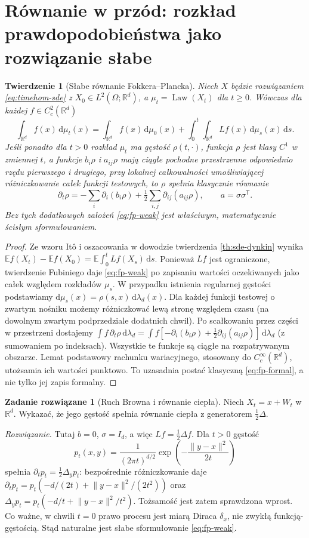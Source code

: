 \documentclass[11pt,a4paper,oneside]{report}
\numberwithin{equation}{chapter}
\theoremstyle{plain}
\newtheorem{twierdzenie}{Twierdzenie}[chapter]
\theoremstyle{definition}
\newtheorem{zadanie}{Zadanie rozwiązane}[chapter]
\theoremstyle{remark}
\newcommand{\R}{\mathbb{R}}
\newcommand{\E}{\mathbb{E}}
\newcommand{\Law}{\operatorname{Law}}
\newcommand{\dd}{\mathrm{d}}
\newcommand{\norm}[1]{\lVert #1\rVert}
\begin{document}
\section{Równanie w przód: rozkład prawdopodobieństwa jako rozwiązanie słabe}
\begin{twierdzenie}[Słabe równanie Fokkera--Plancka]
\label{th:sde-fp}
Niech $X$ będzie rozwiązaniem \eqref{eq:timehom-sde}
z $X_0\in L^2(\Omega;\R^d)$, a
$\mu_t=\Law(X_t)$ dla $t\ge0$. Wówczas dla każdej
$f\in C_c^2(\R^d)$
\[
\int_{\R^d}f(x)\,\dd\mu_t(x)
=\int_{\R^d}f(x)\,\dd\mu_0(x)
+\int_0^t\int_{\R^d}Lf(x)\,\dd\mu_s(x)\,\dd s.
\tag{6.9}\label{eq:fp-weak}
\]
Jeśli ponadto dla $t>0$ rozkład $\mu_t$ ma gęstość
$\rho(t,\cdot)$, funkcja $\rho$ jest klasy $C^1$
w zmiennej $t$, a funkcje $b_i\rho$ i $a_{ij}\rho$
mają ciągłe pochodne przestrzenne odpowiednio rzędu
pierwszego i drugiego, przy lokalnej całkowalności
umożliwiającej różniczkowanie całek funkcji testowych,
to $\rho$ spełnia klasycznie równanie
\[
\partial_t\rho
=-\sum_i\partial_i(b_i\rho)
+\tfrac12\sum_{i,j}\partial_{ij}(a_{ij}\rho),
\qquad a=\sigma\sigma^{\mathsf T}.
\tag{6.10}\label{eq:fp-formal}
\]
Bez tych dodatkowych założeń \eqref{eq:fp-weak}
jest właściwym, matematycznie ścisłym sformułowaniem.
\end{twierdzenie}
\begin{proof}
Ze wzoru Itô i oszacowania w dowodzie twierdzenia
\ref{th:sde-dynkin} wynika
$\E f(X_t)-\E f(X_0)=\E\int_0^t Lf(X_s)\,\dd s$.
Ponieważ $Lf$ jest ograniczone, twierdzenie Fubiniego
daje \eqref{eq:fp-weak} po zapisaniu wartości
oczekiwanych jako całek względem rozkładów $\mu_s$.
W przypadku istnienia regularnej gęstości podstawiamy
$\dd\mu_s(x)=\rho(s,x)\,\dd\lambda_d(x)$.
Dla każdej funkcji testowej o zwartym nośniku możemy
różniczkować lewą stronę względem czasu (na dowolnym
zwartym podprzedziale dodatnich chwil). Po scałkowaniu
przez części w przestrzeni dostajemy
$\int f\,\partial_t\rho\,\dd\lambda_d
=\int f[-\partial_i(b_i\rho)+\frac12\partial_{ij}(a_{ij}\rho)]
\,\dd\lambda_d$ (z sumowaniem po indeksach).
Wszystkie te funkcje są ciągłe na rozpatrywanym obszarze.
Lemat podstawowy rachunku wariacyjnego, stosowany do
$C_c^\infty(\R^d)$, utożsamia ich wartości punktowo.
To uzasadnia postać klasyczną \eqref{eq:fp-formal},
a nie tylko jej zapis formalny.
\end{proof}

\begin{zadanie}[Ruch Browna i równanie ciepła]
Niech $X_t=x+W_t$ w $\R^d$. Wykazać, że jego gęstość
spełnia równanie ciepła z generatorem $\tfrac12\Delta$.

\emph{Rozwiązanie.} Tutaj $b=0$, $\sigma=I_d$,
a więc $Lf=\tfrac12\Delta f$. Dla $t>0$ gęstość
\[
p_t(x,y)=\frac1{(2\pi t)^{d/2}}
\exp\!\left(-\frac{\norm{y-x}^2}{2t}\right)
\]
spełnia $\partial_t p_t=\frac12\Delta_y p_t$:
bezpośrednie różniczkowanie daje
$\partial_t p_t=p_t(-d/(2t)+\norm{y-x}^2/(2t^2))$
oraz
$\Delta_y p_t=p_t(-d/t+\norm{y-x}^2/t^2)$.
Tożsamość jest zatem sprawdzona wprost.
Co ważne, w chwili $t=0$ prawo procesu jest miarą
Diraca $\delta_x$, nie zwykłą funkcją-gęstością.
Stąd naturalne jest słabe sformułowanie
\eqref{eq:fp-weak}.
\end{zadanie}
\end{document}
